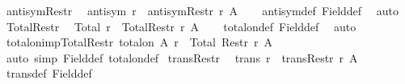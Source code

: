 \begin{isabellebody}
{\isafoldproof}%
%
\isadelimproof
\isanewline
%
\endisadelimproof
\isanewline
{}\isamarkupfalse%
\ antisym{\isacharunderscore}{\kern0pt}Restr{\isacharcolon}{\kern0pt}\isanewline
\ \ {\isachardoublequoteopen}antisym\ r\ {\isasymLongrightarrow}\ antisym{\isacharparenleft}{\kern0pt}Restr\ r\ A{\isacharparenright}{\kern0pt}{\isachardoublequoteclose}\isanewline
%
\isadelimproof
\ \ %
\endisadelimproof
%
\isatagproof
{}\isamarkupfalse%
\ antisym{\isacharunderscore}{\kern0pt}def\ Field{\isacharunderscore}{\kern0pt}def\ \isamarkupfalse%
\ auto%
\endisatagproof
{\isafoldproof}%
%
\isadelimproof
\isanewline
%
\endisadelimproof
\isanewline
{}\isamarkupfalse%
\ Total{\isacharunderscore}{\kern0pt}Restr{\isacharcolon}{\kern0pt}\isanewline
\ \ {\isachardoublequoteopen}Total\ r\ {\isasymLongrightarrow}\ Total{\isacharparenleft}{\kern0pt}Restr\ r\ A{\isacharparenright}{\kern0pt}{\isachardoublequoteclose}\isanewline
%
\isadelimproof
\ \ %
\endisadelimproof
%
\isatagproof
{}\isamarkupfalse%
\ total{\isacharunderscore}{\kern0pt}on{\isacharunderscore}{\kern0pt}def\ Field{\isacharunderscore}{\kern0pt}def\ \isamarkupfalse%
\ auto%
\endisatagproof
{\isafoldproof}%
%
\isadelimproof
\isanewline
%
\endisadelimproof
\isanewline
{}\isamarkupfalse%
\ total{\isacharunderscore}{\kern0pt}on{\isacharunderscore}{\kern0pt}imp{\isacharunderscore}{\kern0pt}Total{\isacharunderscore}{\kern0pt}Restr{\isacharcolon}{\kern0pt}\ {\isachardoublequoteopen}total{\isacharunderscore}{\kern0pt}on\ A\ r\ {\isasymLongrightarrow}\ Total\ {\isacharparenleft}{\kern0pt}Restr\ r\ A{\isacharparenright}{\kern0pt}{\isachardoublequoteclose}\isanewline
%
\isadelimproof
\ \ %
\endisadelimproof
%
\isatagproof
{}\isamarkupfalse%
\ {\isacharparenleft}{\kern0pt}auto\ simp{\isacharcolon}{\kern0pt}\ Field{\isacharunderscore}{\kern0pt}def\ total{\isacharunderscore}{\kern0pt}on{\isacharunderscore}{\kern0pt}def{\isacharparenright}{\kern0pt}%
\endisatagproof
{\isafoldproof}%
%
\isadelimproof
\isanewline
%
\endisadelimproof
\isanewline
{}\isamarkupfalse%
\ trans{\isacharunderscore}{\kern0pt}Restr{\isacharcolon}{\kern0pt}\isanewline
\ \ {\isachardoublequoteopen}trans\ r\ {\isasymLongrightarrow}\ trans{\isacharparenleft}{\kern0pt}Restr\ r\ A{\isacharparenright}{\kern0pt}{\isachardoublequoteclose}\isanewline
%
\isadelimproof
\ \ %
\endisadelimproof
%
\isatagproof
{}\isamarkupfalse%
\ trans{\isacharunderscore}{\kern0pt}def\ Field{\isacharunderscore}{\kern0pt}def\ \isamarkupfalse%

\end{isabellebody}
